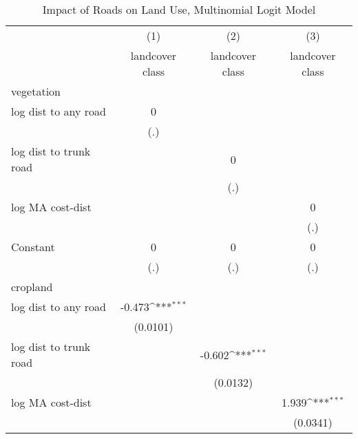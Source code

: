 \begin{table}[htbp]\centering
\def\sym#1{\ifmmode^{#1}\else\(^{#1}\)\fi}
\caption{Impact of Roads on Land Use, Multinomial Logit Model}
\begin{tabular}{l*{3}{c}}
\hline\hline
                    &\multicolumn{1}{c}{(1)}&\multicolumn{1}{c}{(2)}&\multicolumn{1}{c}{(3)}\\
                    &\multicolumn{1}{c}{landcover class}&\multicolumn{1}{c}{landcover class}&\multicolumn{1}{c}{landcover class}\\
\hline
vegetation          &                     &                     &                     \\
log dist to any road&           0         &                     &                     \\
                    &         (.)         &                     &                     \\
[1em]
log dist to trunk road&                     &           0         &                     \\
                    &                     &         (.)         &                     \\
[1em]
log MA cost-dist    &                     &                     &           0         \\
                    &                     &                     &         (.)         \\
[1em]
Constant            &           0         &           0         &           0         \\
                    &         (.)         &         (.)         &         (.)         \\
\hline
cropland            &                     &                     &                     \\
log dist to any road&      -0.473\sym{***}&                     &                     \\
                    &    (0.0101)         &                     &                     \\
[1em]
log dist to trunk road&                     &      -0.602\sym{***}&                     \\
                    &                     &    (0.0132)         &                     \\
[1em]
log MA cost-dist    &                     &                     &       1.939\sym{***}\\
                    &                     &                     &    (0.0341)         \\

\end{tabular}
\end{table}
